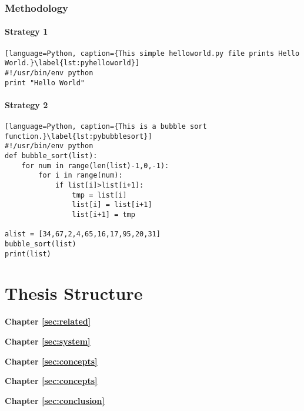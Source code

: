 \cite{WEB:GNU:GPL:2010,WEB:Miede:2011}
\Blindtext[1][1]

\subsubsection{Methodology}
\label{sec:intro:results:refs:method}

\Blindtext[1][2]

\paragraph{Strategy 1}
\Blindtext[1][1]

\begin{lstlisting}[language=Python, caption={This simple helloworld.py file prints Hello World.}\label{lst:pyhelloworld}]
#!/usr/bin/env python
print "Hello World"
\end{lstlisting}

\paragraph{Strategy 2}
\Blindtext[1][1]

\begin{lstlisting}[language=Python, caption={This is a bubble sort function.}\label{lst:pybubblesort}]
#!/usr/bin/env python
def bubble_sort(list):
    for num in range(len(list)-1,0,-1):
        for i in range(num):
            if list[i]>list[i+1]:
                tmp = list[i]
                list[i] = list[i+1]
                list[i+1] = tmp

alist = [34,67,2,4,65,16,17,95,20,31]
bubble_sort(list)
print(list)
\end{lstlisting}

\section{Thesis Structure}
\label{sec:intro:structure}

\textbf{Chapter \ref{sec:related}} \\[0.2em]
\blindtext

\textbf{Chapter \ref{sec:system}} \\[0.2em]
\blindtext

\textbf{Chapter \ref{sec:concepts}} \\[0.2em]
\blindtext

\textbf{Chapter \ref{sec:concepts}} \\[0.2em]
\blindtext

\textbf{Chapter \ref{sec:conclusion}} \\[0.2em]
\blindtext
